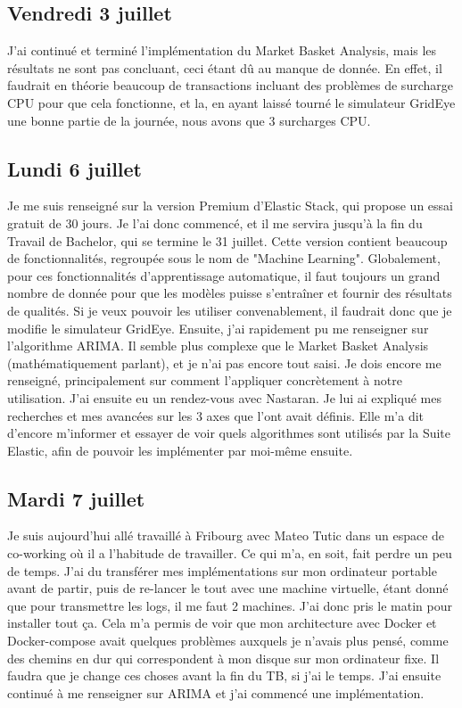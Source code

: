 \documentclass[paper=a4, fontsize=11pt]{scrartcl}
\begin{document}
\subsection{Vendredi 3 juillet}
    J'ai continué et terminé l'implémentation du Market Basket Analysis, mais les résultats ne sont pas concluant, ceci étant dû au manque de donnée. En effet, il faudrait en théorie beaucoup de transactions incluant des problèmes de surcharge CPU pour que cela fonctionne, et la, en ayant laissé tourné le simulateur GridEye une bonne partie de la journée, nous avons que 3 surcharges CPU.
\subsection{Lundi 6 juillet}
    Je me suis renseigné sur la version Premium d'Elastic Stack, qui propose un essai gratuit de 30 jours. Je l'ai donc commencé, et il me servira jusqu'à la fin du Travail de Bachelor, qui se termine le 31 juillet. Cette version contient beaucoup de fonctionnalités, regroupée sous le nom de "Machine Learning". Globalement, pour ces fonctionnalités d'apprentissage automatique, il faut toujours un grand nombre de donnée pour que les modèles puisse s'entraîner et fournir des résultats de qualités. Si je veux pouvoir les utiliser convenablement, il faudrait donc que je modifie le simulateur GridEye. Ensuite, j'ai rapidement pu me renseigner sur l'algorithme ARIMA. Il semble plus complexe que le Market Basket Analysis (mathématiquement parlant), et je n'ai pas encore tout saisi. Je dois encore me renseigné, principalement sur comment l'appliquer concrètement à notre utilisation. J'ai ensuite eu un rendez-vous avec Nastaran. Je lui ai expliqué mes recherches et mes avancées sur les 3 axes que l'ont avait définis. Elle m'a dit d'encore m'informer et essayer de voir quels algorithmes sont utilisés par la Suite Elastic, afin de pouvoir les implémenter par moi-même ensuite.
\subsection{Mardi 7 juillet}
    Je suis aujourd'hui allé travaillé à Fribourg avec Mateo Tutic dans un espace de co-working où il a l'habitude de travailler. Ce qui m'a, en soit, fait perdre un peu de temps. J'ai du transférer mes implémentations sur mon ordinateur portable avant de partir, puis de re-lancer le tout avec une machine virtuelle, étant donné que pour transmettre les logs, il me faut 2 machines. J'ai donc pris le matin pour installer tout ça. Cela m'a permis de voir que mon architecture avec Docker et Docker-compose avait quelques problèmes auxquels je n'avais plus pensé, comme des chemins en dur qui correspondent à mon disque sur mon ordinateur fixe. Il faudra que je change ces choses avant la fin du TB, si j'ai le temps. J'ai ensuite continué à me renseigner sur ARIMA et j'ai commencé une implémentation.
\end{document}
